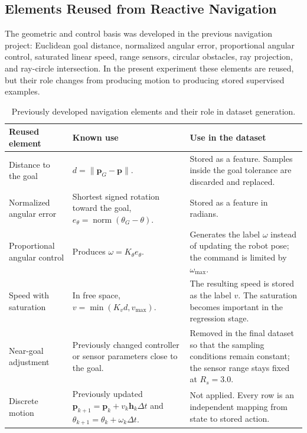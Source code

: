 \documentclass[10pt,twocolumn,a4paper]{article}
\begin{document}
\subsection{Elements Reused from Reactive Navigation}

The geometric and control basis was developed in the previous navigation
project: Euclidean goal distance, normalized angular error, proportional
angular control, saturated linear speed, range sensors, circular obstacles,
ray projection, and ray-circle intersection. In the present experiment these
elements are reused, but their role changes from producing motion to producing
stored supervised examples.

\begin{table}[!t]
\centering
\small
\caption{Previously developed navigation elements and their role in dataset generation.}
\label{tab:reused_elements}
\begin{tabular}{>{\raggedright\arraybackslash}p{}
                >{\raggedright\arraybackslash}p{}
                >{\raggedright\arraybackslash}p{}}
\toprule
\textbf{Reused element} & \textbf{Known use} & \textbf{Use in the dataset} \\
\midrule
Distance to the goal
& $d=\lVert\mathbf{p}_G-\mathbf{p}\rVert$.
& Stored as a feature. Samples inside the goal tolerance are discarded and replaced. \\

Normalized angular error
& Shortest signed rotation toward the goal, $e_\theta=\operatorname{norm}(\theta_G-\theta)$.
& Stored as a feature in radians. \\

Proportional angular control
& Produces $\omega=K_\theta e_\theta$.
& Generates the label $\omega$ instead of updating the robot pose; the command is limited by $\omega_{\max}$. \\

Speed with saturation
& In free space, $v=\min(K_v d,v_{\max})$.
& The resulting speed is stored as the label $v$. The saturation becomes important in the regression stage. \\

Near-goal adjustment
& Previously changed controller or sensor parameters close to the goal.
& Removed in the final dataset so that the sampling conditions remain constant; the sensor range stays fixed at $R_s=3.0$. \\

Discrete motion
& Previously updated $\mathbf{p}_{k+1}=\mathbf{p}_k+v_k\mathbf{h}_k\Delta t$ and $\theta_{k+1}=\theta_k+\omega_k\Delta t$.
& Not applied. Every row is an independent mapping from state to stored action. \\


\end{tabular}
\end{table}
\end{document}
